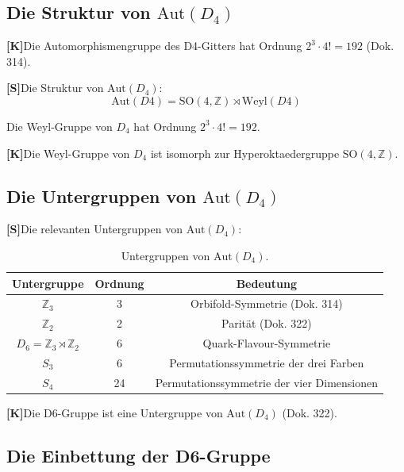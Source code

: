 \documentclass[11pt,a4paper]{article}
\newcommand{\Kstatus}{\textbf{[K]}}
\newcommand{\Sstatus}{\textbf{[S]}}
\begin{document}
	\subsection{Die Struktur von $\text{Aut}(D_4)$}
	
	\Kstatus Die Automorphismengruppe des D4-Gitters hat Ordnung $2^3 \cdot 4! = 192$ (Dok. 314).
	
	\Sstatus Die Struktur von $\text{Aut}(D_4)$:
	\begin{equation}
		\text{Aut}(D4) = \text{SO}(4, \mathbb{Z}) \rtimes \text{Weyl}(D4)
	\end{equation}
	
	Die Weyl-Gruppe von $D_4$ hat Ordnung $2^3 \cdot 4! = 192$.
	
	\Kstatus Die Weyl-Gruppe von $D_4$ ist isomorph zur Hyperoktaedergruppe $\text{SO}(4, \mathbb{Z})$.
	
	\subsection{Die Untergruppen von $\text{Aut}(D_4)$}
	
	\Sstatus Die relevanten Untergruppen von $\text{Aut}(D_4)$:
	
	\begin{table}[h!]
		\centering
		\caption{Untergruppen von $\text{Aut}(D_4)$.}
		\label{tab:subgroups}
		\begin{tabular}{c c c}
			\toprule
			\textbf{Untergruppe} & \textbf{Ordnung} & \textbf{Bedeutung} \\
			\midrule
			$\mathbb{Z}_3$ & 3 & Orbifold-Symmetrie (Dok. 314) \\
			$\mathbb{Z}_2$ & 2 & Parität (Dok. 322) \\
			$D_6 = \mathbb{Z}_3 \rtimes \mathbb{Z}_2$ & 6 & Quark-Flavour-Symmetrie \\
			$S_3$ & 6 & Permutationssymmetrie der drei Farben \\
			$S_4$ & 24 & Permutationssymmetrie der vier Dimensionen \\
			\bottomrule
		\end{tabular}
	\end{table}
	
	\Kstatus Die D6-Gruppe ist eine Untergruppe von $\text{Aut}(D_4)$ (Dok. 322).
	
	\subsection{Die Einbettung der D6-Gruppe}
	
\end{document}
